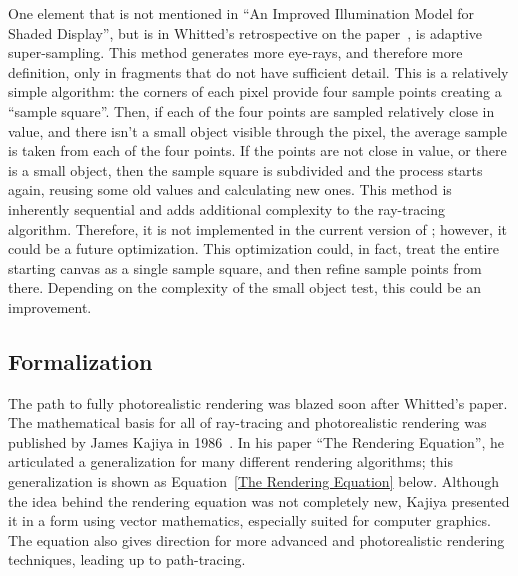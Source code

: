 One element that is not mentioned in ``An Improved Illumination Model for Shaded Display'', but is in Whitted's retrospective on the paper~\cite{whitted2018explains}, is adaptive super-sampling.
This method generates more eye-rays, and therefore more definition, only in fragments that do not have sufficient detail.
This is a relatively simple algorithm: the corners of each pixel provide four sample points creating a ``sample square''.
Then, if each of the four points are sampled relatively close in value, and there isn't a small object visible through the pixel, the average sample is taken from each of the four points.
If the points are not close in value, or there is a small object, then the sample square is subdivided and the process starts again, reusing some old values and calculating new ones.
This method is inherently sequential and adds additional complexity to the ray-tracing algorithm.
Therefore, it is not implemented in the current version of \name{}; however, it could be a future optimization.
This optimization could, in fact, treat the entire starting canvas as a single sample square, and then refine sample points from there.
Depending on the complexity of the small object test, this could be an improvement.

\subsection{Formalization}
\label{ch:relatedwork:discovery:formalization}

The path to fully photorealistic rendering was blazed soon after Whitted's paper.
The mathematical basis for all of ray-tracing and photorealistic rendering was published by James Kajiya in 1986~\cite{kajiya1986rendering}.
In his paper ``The Rendering Equation'', he articulated a generalization for many different rendering algorithms; this generalization is shown as Equation~\ref{The Rendering Equation} below.
Although the idea behind the rendering equation was not completely new, Kajiya presented it in a form using vector mathematics, especially suited for computer graphics.
The equation also gives direction for more advanced and photorealistic rendering techniques, leading up to path-tracing.



